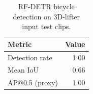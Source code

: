 \begin{table}[t]
\centering
\caption{RF-DETR bicycle detection on 3D-lifter input test clips.}
\begin{tabular}{lr}
\toprule
Metric & Value \\
\midrule
Detection rate & 1.00 \\
Mean IoU & 0.66 \\
AP@0.5 (proxy) & 1.00 \\
\bottomrule
\end{tabular}
\end{table}
